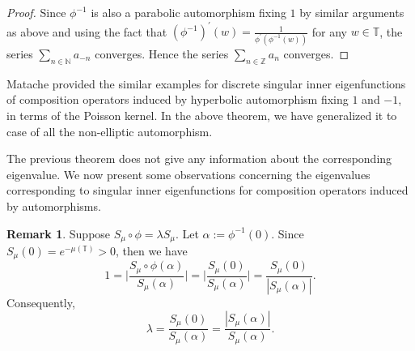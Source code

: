 \documentclass[12pt, reqno]{amsart}
\theoremstyle{definition}
\newtheorem{remark}[theorem]{Remark}
\numberwithin{equation}{section}
\begin{document}
\begin{proof}
Since $\phi^{-1}$  is also a parabolic automorphism fixing $1$ by similar arguments as above and using the fact that $(\phi^{-1})^{'}(w)=\frac{1}{\phi^{'}(\phi^{-1}(w))}$ for any $w \in \mathbb{T}$, the series $\sum_{n\in \mathbb{N}}a_{-n}$ converges. Hence the series $\sum_{n\in \mathbb{Z}}a_n$  converges.





\end{proof}

	
	Matache \cite{matachenum} provided the similar examples for discrete singular inner eigenfunctions of composition operators induced by hyperbolic automorphism fixing $1$ and $-1$, in terms of the Poisson kernel. In the above theorem, we have generalized it to case of all the non-elliptic automorphism.


The previous theorem does not give any information about the corresponding eigenvalue. We now present some observations concerning the eigenvalues corresponding to singular inner eigenfunctions for composition operators induced by automorphisms.
\begin{remark}\label{value}
Suppose $S_\mu \circ \phi=\lambda S_\mu$. Let $\alpha:=\phi^{-1}(0)$. Since $S_\mu(0)=e^{-\mu(\mathbb{T})}>0$, then we have
	$$1=\Big|\frac{S_\mu\circ \phi(\alpha)}{S_\mu(\alpha)}\Big|=\Big|\frac{S_\mu(0)}{S_\mu(\alpha)}\Big|=\frac{S_\mu(0)}{|S_\mu(\alpha)|}.$$
	Consequently, $$\lambda=\frac{S_\mu(0)}{S_\mu(\alpha)}=\frac{|S_\mu(\alpha)|}{S_\mu(\alpha)}.$$
\end{remark}
\end{document}
